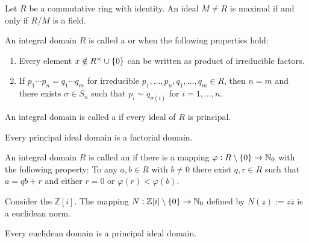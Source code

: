 \begin{proposition}
	Let $R$ be a commutative ring with identity. An ideal $M \neq R$ is maximal if and only if $R/M$ is a field.
\end{proposition}

\begin{definition}
	An integral domain $R$ is called a  or  when the following properties hold: 

	\begin{enumerate}
		\item Every element $x \notin R^\times \cup \cbr[0]{0}$ can be written as product of irreducible factors.

		\item If $p_1 \cdots p_n = q_1 \cdots q_m$ for irreducible $p_1,\dots,p_n,q_1,\dots,q_m \in R$, then $n = m$ and there exists $\sigma \in S_n$ such that $p_i \sim q_{\sigma(i)}$ for $i = 1,\dots,n$.
	\end{enumerate}
\end{definition}

\begin{definition}
	An integral domain is called a  if every ideal of $R$ is principal.
\end{definition}

\begin{theorem}
	Every principal ideal domain is a factorial domain.
\end{theorem}

\begin{definition}
	An integral domain $R$ is called an  if there is a mapping $\varphi: R \setminus \cbr[0]{0} \to \mathbb{N}_0$ with the following property: To any $a,b \in R$ with $b \neq 0$ there exist $q,r \in R$ such that $a = qb + r$ and either $r = 0$ or $\varphi(r) < \varphi(b)$.
\end{definition}

\begin{example}
	Consider the  $\mathbb{Z}[i]$. The mapping $N: \mathbb{Z}[i] \setminus \cbr[0]{0} \to \mathbb{N}_0$ defined by $N(z) := z \overline{z}$ is a euclidean norm.
\end{example}

\begin{theorem}
	Every euclidean domain is a principal ideal domain.
\end{theorem}

